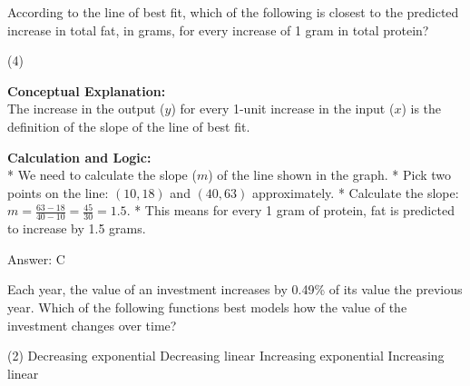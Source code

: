 \documentclass[11pt,paper=a4,answers]{exam}
\begin{document}
\begin{questions}
\question
\begin{center}
\end{center}
According to the line of best fit, which of the following is closest to the predicted increase in total fat, in grams, for every increase of 1 gram in total protein?
\begin{tasks}(4)
\end{tasks}

\begin{solution}
\textbf{Conceptual Explanation:} \\
The increase in the output ($y$) for every 1-unit increase in the input ($x$) is the definition of the slope of the line of best fit.

\vspace{30pt}

\textbf{Calculation and Logic:} \\
* We need to calculate the slope ($m$) of the line shown in the graph.
* Pick two points on the line: $(10, 18)$ and $(40, 63)$ approximately.
* Calculate the slope: $m = \frac{63 - 18}{40 - 10} = \frac{45}{30} = 1.5$.
* This means for every 1 gram of protein, fat is predicted to increase by 1.5 grams.

\vspace{30pt}

Answer: \colorbox{yellow!100}{C}
\end{solution}

\vspace{60pt}

\question
Each year, the value of an investment increases by 0.49\% of its value the previous year. Which of the following functions best models how the value of the investment changes over time?
\begin{tasks}(2)
    \task Decreasing exponential
    \task Decreasing linear
    \task Increasing exponential
    \task Increasing linear
\end{tasks}


\end{questions}
\end{document}
